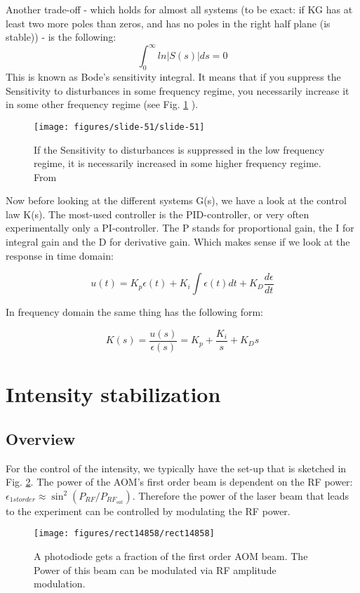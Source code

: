 \documentclass[10pt]{article}
\let\cite\citep
\providecommand\citep{\cite}
\begin{document}
Another trade-off - which holds for almost all systems (to be exact: if KG has at least two more poles than zeros, and has no poles in the right half plane (is stable)) - is the following:
\begin{equation}
\int_0^\infty ln|S(s)|ds =0
\end{equation}
This is known as Bode's sensitivity integral. It means that if you suppress the Sensitivity to disturbances in some frequency regime, you necessarily increase it in some other frequency regime (see Fig. \ref{840965} ).
\begin{figure}[h!]
\begin{center}
\texttt{[image: figures/slide-51/slide-51]}
\caption{{If the Sensitivity to disturbances is suppressed in the low frequency
regime, it is necessarily increased in some higher frequency regime.
From \protect\cite{Stein_2003}
{\label{840965}}%
}}
\end{center}
\end{figure}

Now before looking at the different systems G(s), we have a look at the control law K(s). The most-used controller is the PID-controller, or very often experimentally only a PI-controller. The P stands for proportional gain, the I for integral gain and the D for derivative gain. Which makes sense if we look at the response in time domain:

\begin{equation}
u(t) = K_p\epsilon(t) + K_i\int \epsilon(t) dt + K_D \frac{d\epsilon}{dt}
\end{equation}

In frequency domain the same thing has the following form:

\begin{equation}
K(s) = \frac{u(s)}{\epsilon(s)} = K_p + \frac{K_i}{s} + K_Ds
\end{equation}


\section{Intensity stabilization}\label{intensity-stabilization}

\subsection{Overview}\label{overview}

For the control of the intensity, we typically have the set-up that is
sketched in Fig. \ref{685876}. The power of the AOM's first order beam
is dependent on the RF power: \(\epsilon_{1st order}\approx\sin^2(P_{RF}/P_{RF_{sat}})\). Therefore the power of
the laser beam that leads to the experiment can be controlled by
modulating the RF power.
\begin{figure}[h!]
\begin{center}
\texttt{[image: figures/rect14858/rect14858]}
\caption{{A photodiode gets a fraction of the first order AOM beam. The Power of
this beam can be modulated via RF amplitude modulation.~
{\label{685876}}%
}}
\end{center}
\end{figure}
\end{document}
